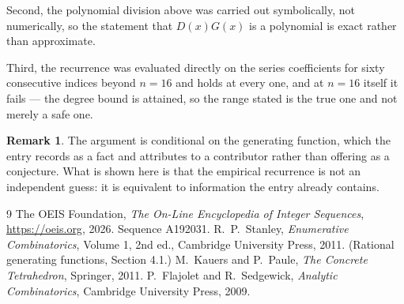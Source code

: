 \documentclass[11pt,a4paper]{article}
\theoremstyle{plain}
\theoremstyle{definition}
\newtheorem{remark}[theorem]{Remark}
\begin{document}
Second, the polynomial division above was carried out symbolically, not numerically, so the
statement that $D(x)G(x)$ is a polynomial is exact rather than approximate.

Third, the recurrence was evaluated directly on the series coefficients for sixty consecutive
indices beyond $n=16$ and holds at every one, and at $n=16$ itself it fails --- the
degree bound is attained, so the range stated is the true one and not merely a safe one.

\begin{remark}
The argument is conditional on the generating function, which the entry records as a fact and
attributes to a contributor rather than offering as a conjecture. What is shown here is that
the empirical recurrence is not an independent guess: it is equivalent to information the
entry already contains.
\end{remark}

\begin{thebibliography}{9}
 The OEIS Foundation, \emph{The On-Line Encyclopedia of Integer
Sequences}, \url{https://oeis.org}, 2026. Sequence A192031.
 R.~P.~Stanley, \emph{Enumerative Combinatorics}, Volume 1, 2nd ed.,
Cambridge University Press, 2011. (Rational generating functions, Section 4.1.)
 M.~Kauers and P.~Paule, \emph{The Concrete Tetrahedron}, Springer, 2011.
 P.~Flajolet and R.~Sedgewick, \emph{Analytic Combinatorics}, Cambridge
University Press, 2009.
\end{thebibliography}
\end{document}
